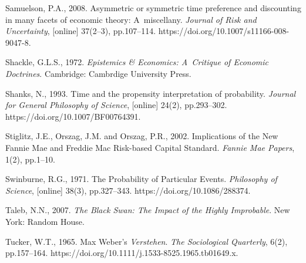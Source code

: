 Samuelson, P.A., 2008. Asymmetric or symmetric time preference and discounting in many facets of economic theory: A~miscellany. \textit{Journal of Risk and Uncertainty}, [online] 37(2–3), pp.107–114. https://doi.org/10.1007/s11166-008-9047-8.



Shackle, G.L.S., 1972. \textit{Epistemics \& Economics: A~Critique of Economic Doctrines}. Cambridge: Cambrdige University Press.



Shanks, N., 1993. Time and the propensity interpretation of probability. \textit{Journal for General Philosophy of Science}, [online] 24(2), pp.293–302. https://doi.org/10.1007/BF00764391.



Stiglitz, J.E., Orszag, J.M. and Orszag, P.R., 2002. Implications of the New Fannie Mae and Freddie Mac Risk-based Capital Standard. \textit{Fannie Mae Papers}, 1(2), pp.1–10.



Swinburne, R.G., 1971. The Probability of Particular Events. \textit{Philosophy of Science}, [online] 38(3), pp.327–343. https://doi.org/10.1086/288374.



Taleb, N.N., 2007. \textit{The Black Swan: The Impact of the Highly Improbable}. New York: Random House.



Tucker, W.T., 1965. Max Weber's \textit{Verstehen}. \textit{The Sociological Quarterly}, 6(2), pp.157–164. https://doi.org/10.1111/j.1533-8525.1965.tb01649.x.



